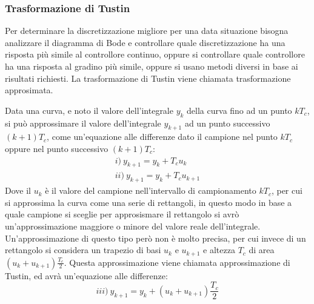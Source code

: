 \documentclass{article}
\numberwithin{equation}{subsection}
\begin{document}
\subsubsection{Trasformazione di Tustin}

Per determinare la discretizzazione migliore per una data situazione bisogna analizzare il diagramma di Bode e controllare quale discretizzazione ha una risposta più simile 
al controllore continuo, oppure si controllare quale controllore ha una risposta al gradino più simile, oppure si usano metodi diversi in base ai risultati richiesti. 
La trasformazione di Tustin viene chiamata trasformazione approsimata. 

Data una curva, e noto il valore dell'integrale $y_k$ della curva fino ad un punto $kT_c$, si può approssimare il valore dell'integrale $y_{k+1}$ ad un punto successivo 
$(k+1)T_c$, come un'equazione alle differenze dato il campione nel punto $kT_c$ oppure nel punto successivo $(k+1)T_c$:
\begin{gather}
    i)\:y_{k+1}=y_k+T_cu_k\\
    ii)\:y_{k+1}=y_k+T_cu_{k+1}
\end{gather}
Dove il $u_k$ è il valore del campione nell'intervallo di campionamento $kT_c$, per cui si approssima la curva come una serie di rettangoli, in questo modo in base 
a quale campione si sceglie per approsismare il rettangolo si avrò un'approssimazione maggiore o minore del valore reale dell'integrale. Un'approssimazione di questo tipo 
però non è molto precisa, per cui invece di un rettangolo si considera un trapezio di basi $u_k$ e $u_{k+1}$ e altezza $T_c$ di area $(u_k+u_{k+1})\displaystyle\frac{T_c}{2}$. 
Questa approssimazione viene chiamata approssimazione di Tustin, ed avrà un'equazione alle differenze:
\begin{equation}
    iii)\:y_{k+1}=y_k+(u_k+u_{k+1})\displaystyle\frac{T_c}{2}
\end{equation}
\end{document}
